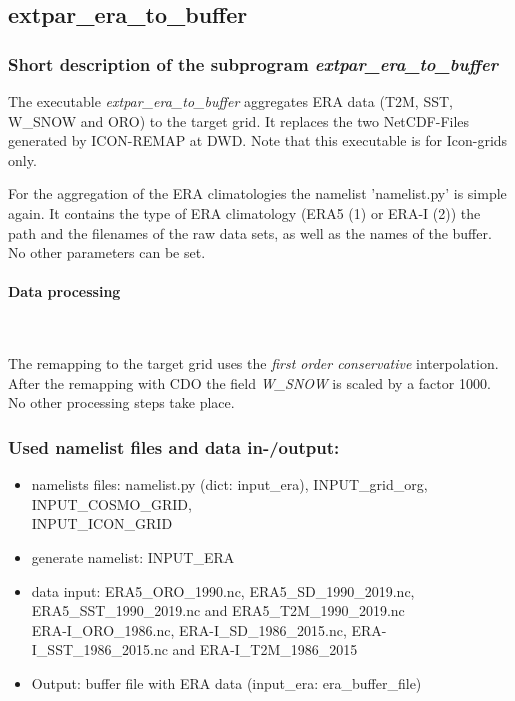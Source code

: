 \documentclass[a4paper,10pt,DIV14,BCOR1cm,titlepage,twoside]{scrartcl}
\begin{document}
\subsection{extpar\_era\_to\_buffer}\label{extpar_era_to_buffer}
\subsubsection{Short description of the subprogram \textit{extpar\_era\_to\_buffer}}
The executable \textit{extpar\_era\_to\_buffer} aggregates ERA data (T2M, SST, W\_SNOW and ORO) to the target grid. It replaces the two NetCDF-Files generated by ICON-REMAP at DWD. Note that this executable is for Icon-grids only.\par\medskip\noindent
For the aggregation of the ERA climatologies the namelist 'namelist.py' is simple again. It contains the type of ERA climatology (ERA5 (1) or ERA-I (2)) the path and the filenames of the raw data sets, as well as the names of the buffer. No other parameters can be set. \par\medskip\noindent
\paragraph{Data processing} \ \par\medskip\noindent
The remapping to the target grid uses the \textit{first order conservative} interpolation. After the remapping with CDO the field \textit{W\_SNOW} is scaled by a factor 1000. No other processing steps take place. 

\subsubsection{Used namelist files and data in-/output:}
\begin{itemize}
 \item namelists files: namelist.py (dict: input\_era), INPUT\_grid\_org, INPUT\_COSMO\_GRID, \\
       INPUT\_ICON\_GRID
 \item generate namelist: INPUT\_ERA
 \item data input: ERA5\_ORO\_1990.nc, ERA5\_SD\_1990\_2019.nc, ERA5\_SST\_1990\_2019.nc and ERA5\_T2M\_1990\_2019.nc \\
       ERA-I\_ORO\_1986.nc, ERA-I\_SD\_1986\_2015.nc, ERA-I\_SST\_1986\_2015.nc and ERA-I\_T2M\_1986\_2015
 \item Output: buffer file with ERA data (input\_era: era\_buffer\_file)
\end{itemize}
\end{document}
